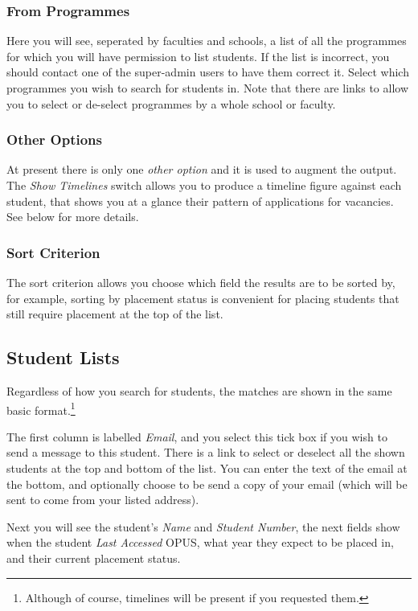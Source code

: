 \documentclass[12 pt]{book}
\begin{document}
\subsubsection{From Programmes}

Here you will see, seperated by faculties and schools, a list of all the
programmes for which you will have permission to list students. If the list
is incorrect, you should contact one of the super-admin users to have them
correct it. Select which programmes you wish to search for students in. Note
that there are links to allow you to select or de-select programmes by a whole
school or faculty.

\subsubsection{Other Options}

At present there is only one \emph{other option} and it is used to augment the
output. The \emph{Show Timelines} switch allows you to produce a timeline
figure against each student, that shows you at a glance their pattern of
applications for vacancies. See below for more details.

\subsubsection{Sort Criterion}

The sort criterion allows you choose which field the results are to be sorted
by, for example, sorting by placement status is convenient for placing students
that still require placement at the top of the list.

\subsection{Student Lists}

Regardless of how you search for students, the matches are shown in the same
basic format.\footnote{Although of course, timelines will be present if you
requested them.}%

The first column is labelled \emph{Email}, and you select this tick box if you
wish to send a message to this student. There is a link to select or deselect
all the shown students at the top and bottom of the list. You can enter the
text of the email at the bottom, and optionally choose to be send a copy of
your email (which will be sent to come from your listed address).

Next you will see the student's \emph{Name} and \emph{Student Number}, the next
fields show when the student \emph{Last Accessed} OPUS, what year they expect
to be placed in, and their current placement status.
\end{document}
